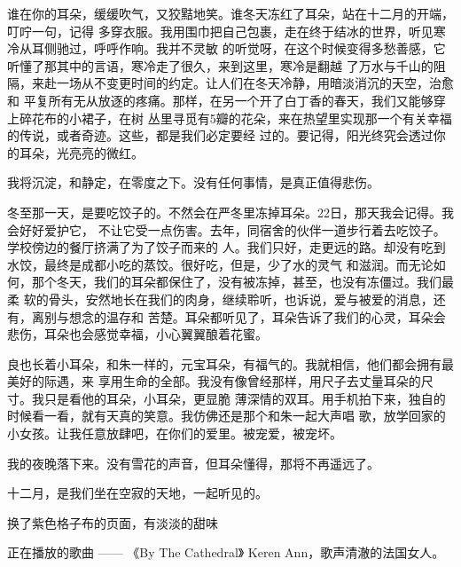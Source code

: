		谁在你的耳朵，缓缓吹气，又狡黠地笑。谁冬天冻红了耳朵，站在十二月的开端，叮咛一句，记得
	多穿衣服。我用围巾把自己包裹，走在终于结冰的世界，听见寒冷从耳侧驰过，呼呼作响。我并不灵敏
	的听觉呀，在这个时候变得多愁善感，它听懂了那其中的言语，寒冷走了很久，来到这里，寒冷是翻越
	了万水与千山的阻隔，来赴一场从不变更时间的约定。让人们在冬天冷静，用暗淡消沉的天空，治愈和
	平复所有无从放逐的疼痛。那样，在另一个开了白丁香的春天，我们又能够穿上碎花布的小裙子，在树
	丛里寻觅有5瓣的花朵，来在热望里实现那一个有关幸福的传说，或者奇迹。这些，都是我们必定要经
	过的。要记得，阳光终究会透过你的耳朵，光亮亮的微红。


		我将沉淀，和静定，在零度之下。没有任何事情，是真正值得悲伤。


		冬至那一天，是要吃饺子的。不然会在严冬里冻掉耳朵。22日，那天我会记得。我会好好爱护它，
	不让它受一点伤害。去年，同宿舍的伙伴一道步行着去吃饺子。学校傍边的餐厅挤满了为了饺子而来的
	人。我们只好，走更远的路。却没有吃到水饺，最终是成都小吃的蒸饺。很好吃，但是，少了水的灵气
	和滋润。而无论如何，那个冬天，我们的耳朵都保住了，没有被冻掉，甚至，也没有冻僵过。我们最柔
	软的骨头，安然地长在我们的肉身，继续聆听，也诉说，爱与被爱的消息，还有，离别与想念的温存和
	苦楚。耳朵都听见了，耳朵告诉了我们的心灵，耳朵会悲伤，耳朵也会感觉幸福，小心翼翼酿着花蜜。


		良也长着小耳朵，和朱一样的，元宝耳朵，有福气的。我就相信，他们都会拥有最美好的际遇，来
	享用生命的全部。我没有像曾经那样，用尺子去丈量耳朵的尺寸。我只是看他的耳朵，小耳朵，更显脆
	薄深情的双耳。用手机拍下来，独自的时候看一看，就有天真的笑意。我仿佛还是那个和朱一起大声唱
	歌，放学回家的小女孩。让我任意放肆吧，在你们的爱里。被宠爱，被宠坏。


		我的夜晚落下来。没有雪花的声音，但耳朵懂得，那将不再遥远了。

		十二月，是我们坐在空寂的天地，一起听见的。


		换了紫色格子布的页面，有淡淡的甜味

		正在播放的歌曲 —— 《By The Cathedral》 Keren Ann，歌声清澈的法国女人。

